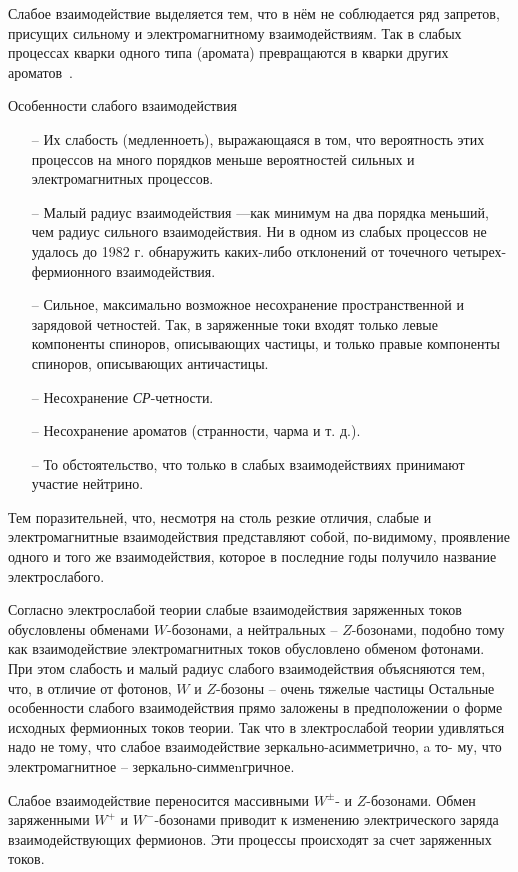 Слабое взаимодействие выделяется тем, что в нём не соблюдается ряд запретов, присущих сильному и электромагнитному взаимодействиям. Так в слабых процессах кварки одного типа (аромата) превращаются в кварки других ароматов~\cite{nuclphys:weak}.

Особенности слабого взаимодействия

\begin{itemize}
	\item[--] Их слабость (медленноеть), выражающаяся в том, что
	вероятность этих процессов на много порядков меньше
	вероятностей сильных и электромагнитных процессов.
	
	\item[--] Малый радиус взаимодействия —как минимум на
	два порядка меньший, чем радиус сильного взаимодействия.
	Ни в одном из слабых процессов не удалось до 1982 г. обнаружить каких-либо отклонений от точечного четырех-
	фермионного взаимодействия.
	
	\item[--] Сильное, максимально возможное несохранение пространственной и зарядовой четностей. Так, в заряженные
	токи входят только левые компоненты спиноров, описывающих частицы, и только правые компоненты спиноров,
	описывающих античастицы.
	
	\item[--] Несохранение \textit{СР}-четности.
	
	\item[--] Несохранение ароматов (странности, чарма и т. д.).
	
	\item[--]  То обстоятельство, что только в слабых взаимодействиях принимают участие нейтрино.
	
\end{itemize}

Тем поразительней, что, несмотря на столь резкие отличия, слабые и электромагнитные взаимодействия представляют собой, по-видимому, проявление одного и того же
взаимодействия, которое в последние годы получило название электрослабого.

Согласно электрослабой теории слабые взаимодействия
заряженных токов обусловлены обменами $W$-бозонами, а
нейтральных -- $Z$-бозонами, подобно тому как взаимодействие электромагнитных токов обусловлено обменом фотонами. При этом слабость и малый радиус слабого взаимодействия объясняются тем, что, в отличие от фотонов, $W$ и $Z$-бозоны -- очень тяжелые частицы Остальные особенности слабого взаимодействия прямо заложены в предположении о форме исходных фермионных токов теории.
Так что в злектрослабой теории удивляться надо не тому,
что слабое взаимодействие зеркально-асимметрично, a то-
му, что электромагнитное -- зеркально-симмеnгричное.

Слабое взаимодействие переносится массивными $W^±$- и $Z$-бозонами. Обмен заряженными $W^+$ и $W^-$-бозонами приводит к изменению электрического заряда взаимодействующих фермионов. Эти процессы происходят за счет заряженных токов.



